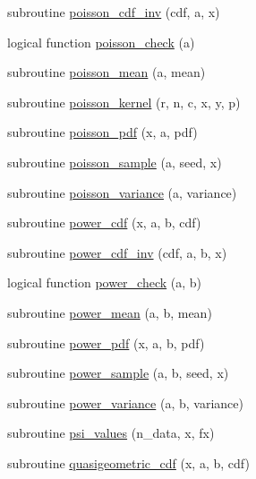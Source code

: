 \begin{DoxyCompactItemize}
\item 
subroutine \hyperlink{_bhabha__fortran__sem__doxy_8f_a006ebeb017e4f7eca24310e7d1d48ba6}{poisson\+\_\+cdf\+\_\+inv} (cdf, a, x)
\item 
logical function \hyperlink{_bhabha__fortran__sem__doxy_8f_ad5ff3a0c4c674bc96d6540e52c714551}{poisson\+\_\+check} (a)
\item 
subroutine \hyperlink{_bhabha__fortran__sem__doxy_8f_ad3501e0bdf09db56d382eeecdadc4527}{poisson\+\_\+mean} (a, mean)
\item 
subroutine \hyperlink{_bhabha__fortran__sem__doxy_8f_a98a27535cff1de1b8e0031ccb5821e5e}{poisson\+\_\+kernel} (r, n, c, x, y, p)
\item 
subroutine \hyperlink{_bhabha__fortran__sem__doxy_8f_af198c42c12a15059e2968d68eb27f389}{poisson\+\_\+pdf} (x, a, pdf)
\item 
subroutine \hyperlink{_bhabha__fortran__sem__doxy_8f_a7f8c43ba4d755c5e82a3559388c2cae9}{poisson\+\_\+sample} (a, seed, x)
\item 
subroutine \hyperlink{_bhabha__fortran__sem__doxy_8f_a33ab451e2813c47185e508089a51228d}{poisson\+\_\+variance} (a, variance)
\item 
subroutine \hyperlink{_bhabha__fortran__sem__doxy_8f_a80622de6b501cb3b7d068a80cb6ac064}{power\+\_\+cdf} (x, a, b, cdf)
\item 
subroutine \hyperlink{_bhabha__fortran__sem__doxy_8f_adc62d8b1d04a836c565406f798dbe564}{power\+\_\+cdf\+\_\+inv} (cdf, a, b, x)
\item 
logical function \hyperlink{_bhabha__fortran__sem__doxy_8f_a1b88b795db7eec8313c8f3fcf0e332e7}{power\+\_\+check} (a, b)
\item 
subroutine \hyperlink{_bhabha__fortran__sem__doxy_8f_aae67147542b531add7881395ab9b9aa5}{power\+\_\+mean} (a, b, mean)
\item 
subroutine \hyperlink{_bhabha__fortran__sem__doxy_8f_a001ee6b823fa4d4c5bc5c8f0a7e92bc4}{power\+\_\+pdf} (x, a, b, pdf)
\item 
subroutine \hyperlink{_bhabha__fortran__sem__doxy_8f_aade9130fea35054838514ae82f0fc6aa}{power\+\_\+sample} (a, b, seed, x)
\item 
subroutine \hyperlink{_bhabha__fortran__sem__doxy_8f_a37db6d376f844e99257c1b319ddbf6b0}{power\+\_\+variance} (a, b, variance)
\item 
subroutine \hyperlink{_bhabha__fortran__sem__doxy_8f_ae149433719bfb4e008585cb535e0a6d9}{psi\+\_\+values} (n\+\_\+data, x, fx)
\item 
subroutine \hyperlink{_bhabha__fortran__sem__doxy_8f_aab048bbbc5041ebb417d263ffe3e72ed}{quasigeometric\+\_\+cdf} (x, a, b, cdf)

\end{DoxyCompactItemize}
